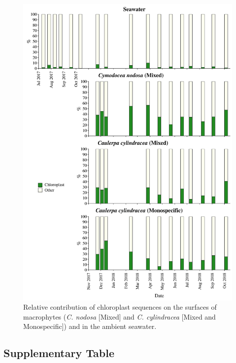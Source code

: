 \documentclass[12pt,]{article}
\begin{document}
\begin{figure}[H]

{\centering \includegraphics[width=0.85\linewidth]{../results/figures/chloroplast_bar_plot} 

}

\caption{Relative contribution of chloroplast sequences on the surfaces of macrophytes (\textit{C. nodosa} [Mixed] and \textit{C. cylindracea} [Mixed and Monospecific]) and in the ambient seawater.\label{chloroplast}}\label{fig:unnamed-chunk-3}
\end{figure}

\hypertarget{supplementary-table}{%
\subsection{Supplementary Table}\label{supplementary-table}}

\begingroup\fontsize{9}{11}\selectfont
\end{document}
